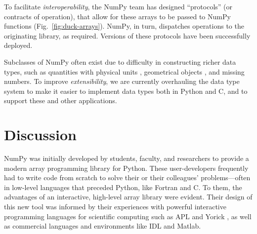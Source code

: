To facilitate \emph{interoperability}, the NumPy team has designed
``protocols'' (or contracts of operation), that allow for these arrays to be
passed to NumPy functions (Fig.~\ref{fig:duck-arrays}).
NumPy, in turn, dispatches operations to the originating library, as required.
Versions of these protocols have been successfully deployed.


Subclasses of NumPy often exist due to difficulty in constructing richer data
types, such as quantities with physical units \cite{astropy,Goldbaum2018,pint},
geometrical objects \cite{pygeos}, and missing numbers.
To improve \emph{extensibility}, we are currently overhauling the data type
system to make it easier to implement data types both in Python and C, and to
support these and other applications.

\section*{Discussion}


NumPy was initially developed by students, faculty, and researchers to
provide a modern array programming library for Python.  These
user-developers frequently had to write code from scratch to solve
their or their colleagues' problems---often in low-level languages
that preceded Python, like Fortran \cite{dongarra2008netlib} and C.
To them, the advantages of an interactive, high-level array library
were evident. Their design of this new tool was informed by their
experiences with powerful interactive programming languages for
scientific computing such as APL \cite{iverson1962programming} and
Yorick \cite{munro1995using}, as well as commercial languages and
environments like IDL and Matlab.

